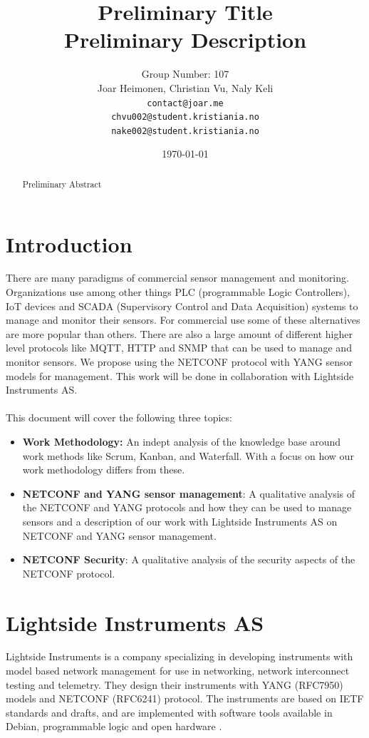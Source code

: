 \documentclass[12pt]{article}
\author{
    Group Number: 107\\
    Joar Heimonen, Christian Vu, Naly Keli \\
    \texttt{contact@joar.me}\\ 
    \texttt{chvu002@student.kristiania.no}\\
    \texttt{nake002@student.kristiania.no}
}
\title{
  \textbf{Preliminary Title}\\
  \large{Preliminary Description}
}
\date{\today}
\begin{document}
\maketitle

\begin{abstract}
  Preliminary Abstract
\end{abstract}

\pagebreak

\tableofcontents

\pagebreak


\section{Introduction}
There are many paradigms of commercial sensor management and monitoring. Organizations use among other things
PLC (programmable Logic Controllers), IoT devices and SCADA (Supervisory Control and Data Acquisition) systems to 
manage and monitor their sensors. For commercial use 
some of these alternatives are more popular than others. There are also a large amount of different higher level protocols
like MQTT, HTTP and SNMP that can be used to manage and monitor sensors. We propose using the NETCONF protocol 
with YANG sensor models for management. This work will be done in collaboration with Lightside Instruments AS.
\\
\\
This document will cover the following three topics:
\begin{itemize}
  \item \textbf{Work Methodology:} An indept analysis of the knowledge base around work methods like Scrum, Kanban, and Waterfall. 
  With a focus on how our work methodology differs from these.
  \item \textbf{NETCONF and YANG sensor management}: A qualitative analysis of the NETCONF and YANG protocols and how they can be used to manage sensors and 
  a description of our work with Lightside Instruments AS on NETCONF and YANG sensor management.
  \item \textbf{NETCONF Security}: A qualitative analysis of the security aspects of the NETCONF protocol.
\end{itemize}

\section{Lightside Instruments AS}
Lightside Instruments is a company specializing in developing instruments with model based network management 
for use in networking, network interconnect testing and telemetry. 
They design their instruments with YANG (RFC7950) \cite{bjorklundYANG11Data2016} models and NETCONF (RFC6241) \cite{ennsNetworkConfigurationProtocol2011} protocol. 
The instruments are based on IETF standards and drafts, 
and are implemented with software tools available in Debian, programmable 
logic and open hardware \cite{LightsideInstrumentsYANG}.
\end{document}
